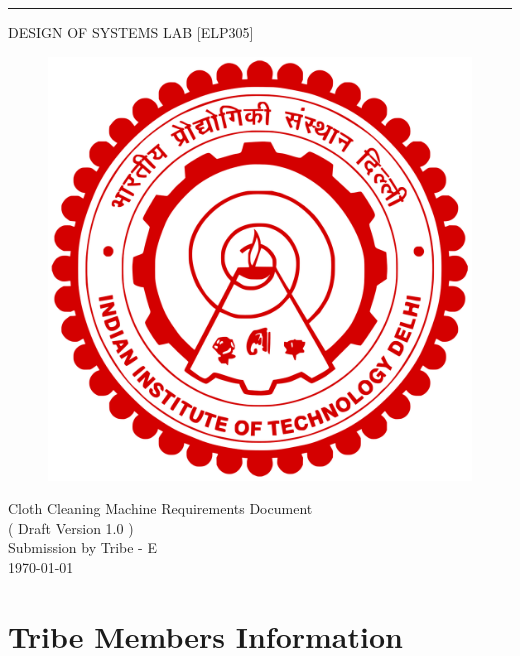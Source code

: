 \documentclass[12pt]{article}
\date{}
\def\myversion{1.0 }
\begin{document}
\begin{center}

    \rule{16cm}{5pt}\vskip1cm
    \begin{bfseries}
        \Huge{DESIGN OF SYSTEMS LAB [ELP305]}\\
        \vspace{2cm}
        \begin{figure}[H]
        \centering
        \includegraphics[width=0.45\linewidth]{iitd_logo.png}
        \end{figure}
        \vspace{0.5cm}
        Cloth Cleaning Machine
        Requirements Document\\
        \LARGE{( Draft Version \myversion)}\\
        \vspace{3.5cm}
        Submission by Tribe - E\\
        \today\\
    \end{bfseries}
\end{center}
\newpage
\tableofcontents
\newpage
\section{Tribe Members Information}
\end{document}

